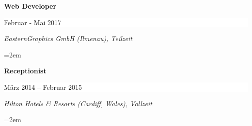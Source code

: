 \documentclass[paper=a4,fontsize=10.4pt]{scrartcl} %
\newcommand{\sepspace}{\vspace*{0.5em}}		%
\newcommand{\EducationEntry}[4]{
		\noindent \textbf{#1} \hfill      %
		\colorbox{White}{%
			\parbox{16em}{%
			\hfill\color{Black}#2}} \par  %
		\noindent \textit{#3} \par        %
		\noindent\hangindent=2em\hangafter=0 \small #4 %
		\normalsize \par}
\begin{document}
\sepspace
\EducationEntry{\color[HTML]{6a040f}Web Developer}{Februar - Mai 2017}{EasternGraphics GmbH (Ilmenau), Teilzeit}{%
}














\sepspace
\EducationEntry{\color[HTML]{6a040f}Receptionist}{März 2014 – Februar 2015}{Hilton Hotels \& Resorts (Cardiff, Wales), Vollzeit}{%
}
\end{document}
